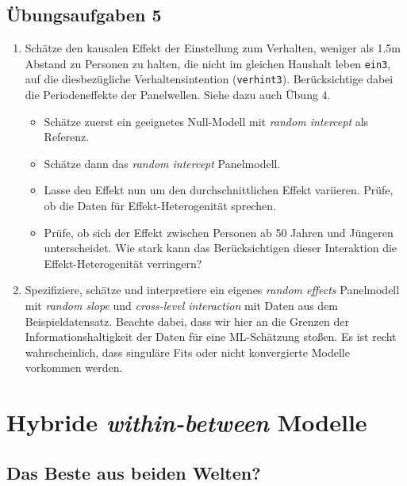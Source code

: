 \documentclass[
]{book}
\providecommand{\tightlist}{%
  \setlength{\itemsep}{0pt}\setlength{\parskip}{0pt}}
\begin{document}
\hypertarget{uxfcbungsaufgaben-5}{%
\section{Übungsaufgaben 5}\label{uxfcbungsaufgaben-5}}

\begin{enumerate}
\def\labelenumi{\arabic{enumi})}
\tightlist
\item
  Schätze den kausalen Effekt der Einstellung zum Verhalten, weniger als 1.5m Abstand zu Personen zu halten, die nicht im gleichen Haushalt leben \texttt{ein3}, auf die diesbezügliche Verhaltensintention (\texttt{verhint3}). Berücksichtige dabei die Periodeneffekte der Panelwellen. Siehe dazu auch Übung 4.

  \begin{itemize}
  \tightlist
  \item
    Schätze zuerst ein geeignetes Null-Modell mit \emph{random intercept} als Referenz.
  \item
    Schätze dann das \emph{random intercept} Panelmodell.
  \item
    Lasse den Effekt nun um den durchschnittlichen Effekt variieren. Prüfe, ob die Daten für Effekt-Heterogenität sprechen.
  \item
    Prüfe, ob sich der Effekt zwischen Personen ab 50 Jahren und Jüngeren unterscheidet. Wie stark kann das Berücksichtigen dieser Interaktion die Effekt-Heterogenität verringern?
  \end{itemize}
\item
  Spezifiziere, schätze und interpretiere ein eigenes \emph{random effects} Panelmodell mit \emph{random slope} und \emph{cross-level interaction} mit Daten aus dem Beispieldatensatz. Beachte dabei, dass wir hier an die Grenzen der Informationshaltigkeit der Daten für eine ML-Schätzung stoßen. Es ist recht wahrscheinlich, dass singuläre Fits oder nicht konvergierte Modelle vorkommen werden.
\end{enumerate}

\hypertarget{hybride-within-between-modelle}{%
\chapter{\texorpdfstring{Hybride \emph{within-between} Modelle}{Hybride within-between Modelle}}\label{hybride-within-between-modelle}}

\hypertarget{das-beste-aus-beiden-welten}{%
\section{Das Beste aus beiden Welten?}\label{das-beste-aus-beiden-welten}}
\end{document}
